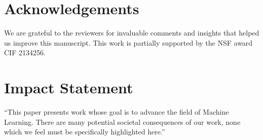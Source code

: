 \documentclass{article}
\theoremstyle{plain}
\theoremstyle{definition}
\theoremstyle{remark}
\begin{document}



\section*{Acknowledgements}

We are grateful to the reviewers for invaluable comments and insights that helped us improve this manuscript. This work is partially supported by the NSF award CIF 2134256.


\section*{Impact Statement}


``This paper presents work whose goal is to advance the field of Machine
Learning. There are many potential societal consequences of our work, none
which we feel must be specifically highlighted here.''



\end{document}
